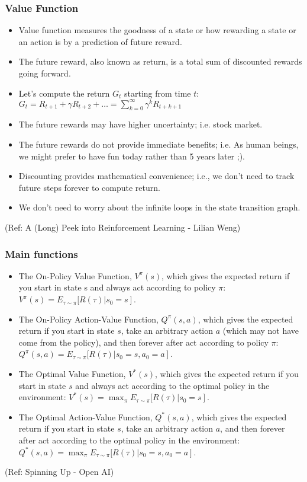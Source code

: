 \begin{frame}[fragile]\frametitle{Value Function}


\begin{itemize}
\item Value function measures the goodness of a state or how rewarding a state or an action is by a
prediction of future reward. 
\item The future reward, also known as return, is a total sum of discounted rewards going forward. 
\item Let's compute the return $G_t$ starting from time $t$: $G_t = R_{t+1} + \gamma R_{t+2} + \ldots = \sum_{k=0}^{\infty} \gamma^kR_{t+k+1}$
\item The future rewards may have higher uncertainty; i.e. stock market.
\item The future rewards do not provide immediate benefits; i.e. As human beings, we might prefer to
have fun today rather than 5 years later ;).
\item Discounting provides mathematical convenience; i.e., we don't need to track future steps forever to
compute return.
\item We don't need to worry about the infinite loops in the state transition graph.
\end{itemize}

{\tiny (Ref: A (Long) Peek into Reinforcement Learning - Lilian Weng)}
\end{frame}

\begin{frame}[fragile]\frametitle{Main functions}

\begin{itemize}
\item The On-Policy Value Function, $V^{\pi}(s)$, which gives the expected return if you start in state s and always act according to policy $\pi$:$V^{\pi}(s) = E_{\tau \sim \pi}[R(\tau)\left| s_0 = s\right]$.
\item The On-Policy Action-Value Function, $Q^{\pi}(s,a)$, which gives the expected return if you start in state $s$, take an arbitrary action $a$ (which may not have come from the policy), and then forever after act according to policy $\pi$: $Q^{\pi}(s,a) = E_{\tau \sim \pi}[R(\tau)\left| s_0 = s, a_0 = a\right]$.
\item The Optimal Value Function, $V^*(s)$, which gives the expected return if you start in state $s$ and always act according to the optimal policy in the environment:
$V^*(s) = \max_{\pi} E_{\tau \sim \pi}[R(\tau)\left| s_0 = s\right]$.
\item The Optimal Action-Value Function, $Q^*(s,a)$, which gives the expected return if you start in state $s$, take an arbitrary action $a$, and then forever after act according to the optimal policy in the environment: $Q^*(s,a) = \max_{\pi} E_{\tau \sim \pi}[R(\tau)\left| s_0 = s, a_0 = a\right]$.
\end{itemize}

{\tiny (Ref: Spinning Up - Open AI)}
\end{frame}



